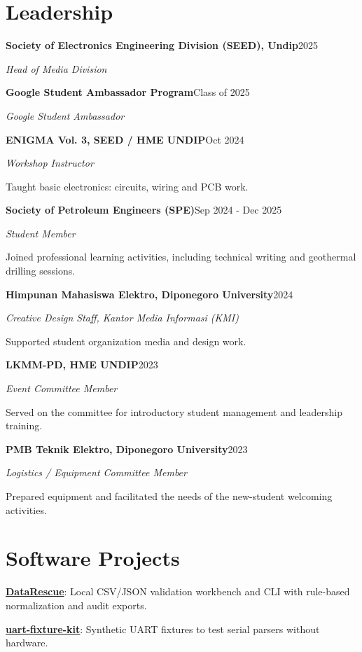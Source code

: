 \documentclass[11pt,a4paper]{article}
\newcommand{\cventry}[5]{\Needspace{4\baselineskip}\textbf{#3}\ifstrempty{#4}{}{, #4}\hfill #1\par\textit{#2}\par #5\par\vspace{4pt}}
\newcommand{\cvitem}[2]{\textbf{#1}: #2\par}
\begin{document}
\section{Leadership}
\cventry{2025}{Head of Media Division}{Society of Electronics Engineering Division (SEED), Undip}{}{}
\cventry{Class of 2025}{Google Student Ambassador}{Google Student Ambassador Program}{}{}
\cventry{Oct 2024}{Workshop Instructor}{ENIGMA Vol. 3, SEED / HME UNDIP}{}{Taught basic electronics: circuits, wiring and PCB work.}
\cventry{Sep 2024 - Dec 2025}{Student Member}{Society of Petroleum Engineers (SPE)}{}{Joined professional learning activities, including technical writing and geothermal drilling sessions.}
\cventry{2024}{Creative Design Staff, Kantor Media Informasi (KMI)}{Himpunan Mahasiswa Elektro, Diponegoro University}{}{Supported student organization media and design work.}
\cventry{2023}{Event Committee Member}{LKMM-PD, HME UNDIP}{}{Served on the committee for introductory student management and leadership training.}
\cventry{2023}{Logistics / Equipment Committee Member}{PMB Teknik Elektro, Diponegoro University}{}{Prepared equipment and facilitated the needs of the new-student welcoming activities.}
\section{Software Projects}
\cvitem{\href{https://github.com/vanovri/datarescue}{DataRescue}}{Local CSV/JSON validation workbench and CLI with rule-based normalization and audit exports.}
\cvitem{\href{https://github.com/vanovri/uart-fixture-kit}{uart-fixture-kit}}{Synthetic UART fixtures to test serial parsers without hardware.}
\end{document}
